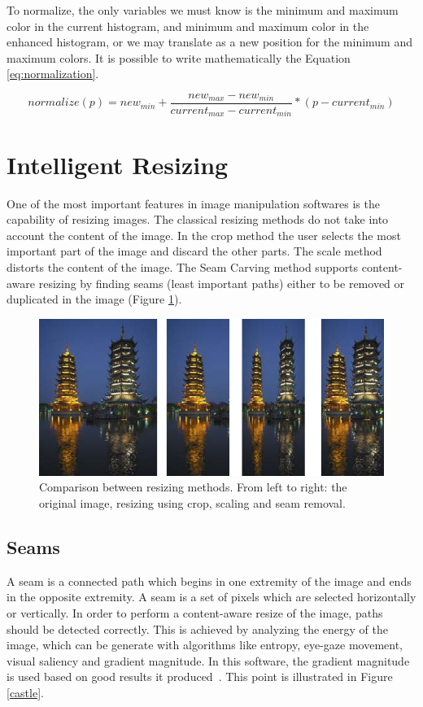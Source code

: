 \documentclass{article}
\begin{document}
		

		To normalize, the only variables we must know is the minimum and maximum color in the current histogram, 
		and minimum and maximum color in the enhanced histogram, or we may translate as a new position for the minimum and maximum colors. It is possible
		to write mathematically the Equation \ref{eq:normalization}. \nocite{*}


		\begin{equation}
			normalize(p)=new_{min}+\frac{new_{max}-new_{min}}{current_{max}-current_{min}}*(p-current_{min})
			\label{eq:normalization}
		\end{equation}
		

\section{Intelligent Resizing}

	One of the most important features in image manipulation softwares is the capability of resizing images. The classical resizing methods do not take into account the content of the image. In the crop method the user selects the most important part of the image and discard the other parts. The scale method distorts the content of the image. The Seam Carving method supports content-aware resizing by finding seams (least important paths) either to be removed or duplicated in the image (Figure \ref{intelligent1}).

	\begin{figure} [H]
		\centering
		\includegraphics[scale=0.5]{images/intelligent3}
		\caption{Comparison between resizing methods. From left to right: the original image, resizing using crop, scaling and seam removal.\label{intelligent1}}
	\end{figure}

	\subsection{Seams}
	A seam is a connected path which begins in one extremity of the image and ends in the opposite extremity. A seam is a set of pixels which are selected horizontally or vertically. In order to perform a content-aware resize of the image, paths should be detected correctly. This is achieved by analyzing the energy of the image, which can be generate with algorithms like entropy, eye-gaze movement, visual saliency and gradient magnitude. In this software, the gradient magnitude is used based on good results it produced~\cite{ref:seamwiki}. This point is illustrated in Figure \ref{castle}.
\end{document}
